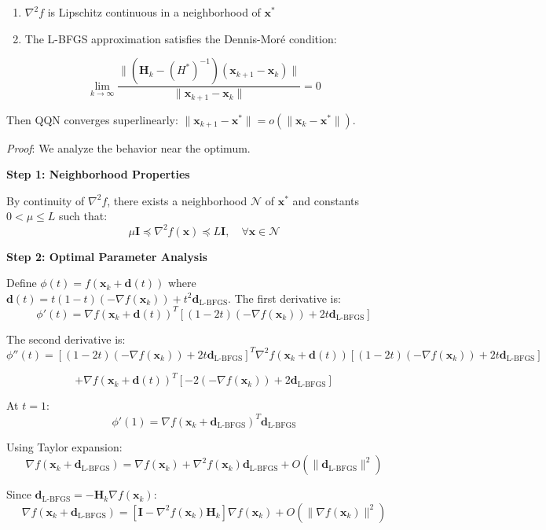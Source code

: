 \begin{enumerate}
\def\labelenumi{\arabic{enumi}.}
\tightlist
\item
  \(\nabla^2 f\) is Lipschitz continuous in a neighborhood of \(\mathbf{x}^*\)
\item
  The L-BFGS approximation satisfies the Dennis-Moré condition:
\end{enumerate}

\[\lim_{k \to \infty} \frac{\|(\mathbf{H}_k - (H^*)^{-1})(\mathbf{x}_{k+1} - \mathbf{x}_k)\|}{\|\mathbf{x}_{k+1} - \mathbf{x}_k\|} = 0\]

Then QQN converges superlinearly: \(\|\mathbf{x}_{k+1} - \mathbf{x}^*\| = o(\|\mathbf{x}_k - \mathbf{x}^*\|)\).

\emph{Proof}: We analyze the behavior near the optimum.

\textbf{Step 1: Neighborhood Properties}

By continuity of \(\nabla^2 f\), there exists a neighborhood \(\mathcal{N}\) of \(\mathbf{x}^*\) and constants \(0 < \mu \leq L\) such that:
\[\mu \mathbf{I} \preceq \nabla^2 f(\mathbf{x}) \preceq L \mathbf{I}, \quad \forall \mathbf{x} \in \mathcal{N}\]

\textbf{Step 2: Optimal Parameter Analysis}

Define \(\phi(t) = f(\mathbf{x}_k + \mathbf{d}(t))\) where \(\mathbf{d}(t) = t(1-t)(-\nabla f(\mathbf{x}_k)) + t^2\mathbf{d}_{\text{L-BFGS}}\).
The first derivative is:
\[\phi'(t) = \nabla f(\mathbf{x}_k + \mathbf{d}(t))^T[(1-2t)(-\nabla f(\mathbf{x}_k)) + 2t\mathbf{d}_{\text{L-BFGS}}]\]

The second derivative is:
\[\phi''(t) = [(1-2t)(-\nabla f(\mathbf{x}_k)) + 2t\mathbf{d}_{\text{L-BFGS}}]^T \nabla^2 f(\mathbf{x}_k + \mathbf{d}(t))[(1-2t)(-\nabla f(\mathbf{x}_k)) + 2t\mathbf{d}_{\text{L-BFGS}}]\]

\[+ \nabla f(\mathbf{x}_k + \mathbf{d}(t))^T[-2(-\nabla f(\mathbf{x}_k)) + 2\mathbf{d}_{\text{L-BFGS}}]\]

At \(t = 1\):
\[\phi'(1) = \nabla f(\mathbf{x}_k + \mathbf{d}_{\text{L-BFGS}})^T \mathbf{d}_{\text{L-BFGS}}\]

Using Taylor expansion:
\[\nabla f(\mathbf{x}_k + \mathbf{d}_{\text{L-BFGS}}) = \nabla f(\mathbf{x}_k) + \nabla^2 f(\mathbf{x}_k)\mathbf{d}_{\text{L-BFGS}} + O(\|\mathbf{d}_{\text{L-BFGS}}\|^2)\]

Since \(\mathbf{d}_{\text{L-BFGS}} = -\mathbf{H}_k\nabla f(\mathbf{x}_k)\):
\[\nabla f(\mathbf{x}_k + \mathbf{d}_{\text{L-BFGS}}) = [\mathbf{I} - \nabla^2 f(\mathbf{x}_k)\mathbf{H}_k]\nabla f(\mathbf{x}_k) + O(\|\nabla f(\mathbf{x}_k)\|^2)\]

